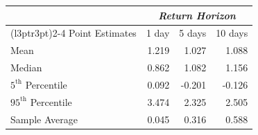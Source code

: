 
\begin{tabular}{lrrr}
\toprule
\multicolumn{1}{c}{\em{ }} & \multicolumn{3}{c}{\em{Return Horizon}} \\
\cmidrule(l{3pt}r{3pt}){2-4}
Point Estimates & 1 day & 5 days & 10 days\\
\midrule
Mean & 1.219 & 1.027 & 1.088\\
Median & 0.862 & 1.082 & 1.156\\
$5^\text{th}$ Percentile & 0.092 & -0.201 & -0.126\\
$95^\text{th}$ Percentile & 3.474 & 2.325 & 2.505\\
\midrule
Sample Average & 0.045 & 0.316 & 0.588\\
\bottomrule
\end{tabular}
